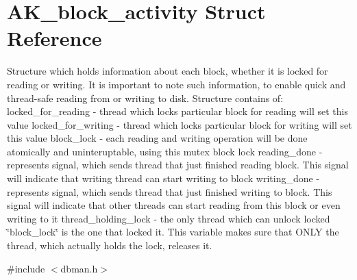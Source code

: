 \hypertarget{structAK__block__activity}{}\section{A\+K\+\_\+block\+\_\+activity Struct Reference}
\label{structAK__block__activity}


Structure which holds information about each block, whether it is locked for reading or writing. It is important to note such information, to enable quick and thread-\/safe reading from or writing to disk. Structure contains of\+: locked\+\_\+for\+\_\+reading -\/ thread which locks particular block for reading will set this value locked\+\_\+for\+\_\+writing -\/ thread which locks particular block for writing will set this value block\+\_\+lock -\/ each reading and writing operation will be done atomically and uninteruptable, using this mutex block lock reading\+\_\+done -\/ represents signal, which sends thread that just finished reading block. This signal will indicate that writing thread can start writing to block writing\+\_\+done -\/ represents signal, which sends thread that just finished writing to block. This signal will indicate that other threads can start reading from this block or even writing to it thread\+\_\+holding\+\_\+lock -\/ the only thread which can unlock locked \char`\"{}block\+\_\+lock\char`\"{} is the one that locked it. This variable makes sure that O\+N\+LY the thread, which actually holds the lock, releases it.  




{\ttfamily \#include $<$dbman.\+h$>$}

